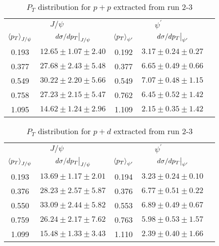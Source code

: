 \documentclass[../main.tex]{subfiles}
\begin{document}
\begin{table}[h!]
\centering
\caption{$P_T$ distribution for $p+p$ extracted from run 2-3}
\begin{tabular}{cc|ccc}
\hline
\multicolumn{2}{c|}{$J/\psi$}                               & \multicolumn{2}{c}{$\psi^{\prime}$}                                &  \\ \cline{1-4}
$\expval{p_T}_{J/\psi}$    & $\eval{d\sigma/dp_T}_{J/\psi}$ & $\expval{p_T}_{\psi^\prime}$ & $\eval{d\sigma/dp_T}_{\psi^\prime}$ &  \\ \cline{1-4}
\multicolumn{1}{c|}{0.193} & $12.65\pm1.07\pm2.40$          & \multicolumn{1}{c|}{0.192}   & $3.17\pm0.24\pm0.27$                &  \\
\multicolumn{1}{c|}{0.377} & $27.68\pm2.43\pm5.48$          & \multicolumn{1}{c|}{0.377}   & $6.65\pm0.49\pm0.66$                &  \\
\multicolumn{1}{c|}{0.549} & $30.22\pm2.20\pm5.66$          & \multicolumn{1}{c|}{0.549}   & $7.07\pm0.48\pm1.15$                &  \\
\multicolumn{1}{c|}{0.758} & $27.23\pm2.15\pm5.47$          & \multicolumn{1}{c|}{0.762}   & $6.45\pm0.52\pm1.42$                &  \\
\multicolumn{1}{c|}{1.095} & $14.62\pm1.24\pm2.96$          & \multicolumn{1}{c|}{1.109}   & $2.15\pm0.35\pm1.42$                &  \\ \cline{1-4}
\end{tabular}
\end{table}
\begin{table}[h!]
\centering
\caption{$P_T$ distribution for $p+d$ extracted from run 2-3}
\begin{tabular}{cc|ccc}
\hline
\multicolumn{2}{c|}{$J/\psi$}                               & \multicolumn{2}{c}{$\psi^{\prime}$}                                &  \\ \cline{1-4}
$\expval{p_T}_{J/\psi}$    & $\eval{d\sigma/dp_T}_{J/\psi}$ & $\expval{p_T}_{\psi^\prime}$ & $\eval{d\sigma/dp_T}_{\psi^\prime}$ &  \\ \cline{1-4}
\multicolumn{1}{c|}{0.193} & $13.69\pm1.17\pm2.01$          & \multicolumn{1}{c|}{0.194}   & $3.23\pm0.24\pm0.10$                &  \\
\multicolumn{1}{c|}{0.376} & $28.23\pm2.57\pm5.87$          & \multicolumn{1}{c|}{0.376}   & $6.77\pm0.51\pm0.22$                &  \\
\multicolumn{1}{c|}{0.550} & $33.09\pm2.44\pm5.82$          & \multicolumn{1}{c|}{0.553}   & $6.89\pm0.49\pm0.67$                &  \\
\multicolumn{1}{c|}{0.759} & $26.24\pm2.17\pm7.62$          & \multicolumn{1}{c|}{0.763}   & $5.98\pm0.53\pm1.57$                &  \\
\multicolumn{1}{c|}{1.099} & $15.48\pm1.33\pm3.43$          & \multicolumn{1}{c|}{1.110}   & $2.39\pm0.40\pm1.66$                &  \\ \cline{1-4}
\end{tabular}
\end{table}
\end{document}
